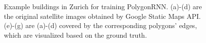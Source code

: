 \begin{figure}[!h]
    \caption{Example buildings in Zurich for training PolygonRNN. (a)-(d) are the original satellite images obtained by Google Static Maps API. (e)-(g) are (a)-(d) covered by the corresponding polygons' edges, which are visualized based on the ground truth.}
	\label{fig:egbui}
\end{figure}